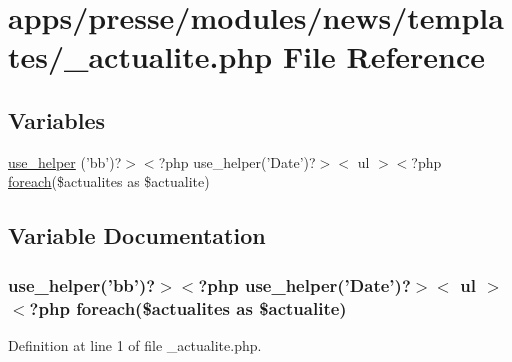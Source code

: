\hypertarget{presse_2modules_2news_2templates_2__actualite_8php}{\section{apps/presse/modules/news/templates/\-\_\-actualite.php File Reference}
\label{presse_2modules_2news_2templates_2__actualite_8php}
}
\subsection*{Variables}
\begin{DoxyCompactItemize}
\item 
\hyperlink{presse_2modules_2news_2templates_2__actualite_8php_a4be81c8b3638bb410a49744c6527babd}{use\-\_\-helper} ('bb')?$>$$<$?php use\-\_\-helper('Date')?$>$$<$ ul $>$$<$?php \hyperlink{presse_2modules_2news_2templates_2index_success_8php_abc56db52b2e9a59bcd5c9e45ac5cb332}{foreach}(\$actualites as \$actualite)
\end{DoxyCompactItemize}


\subsection{Variable Documentation}
\hypertarget{presse_2modules_2news_2templates_2__actualite_8php_a4be81c8b3638bb410a49744c6527babd}{
\subsubsection[{use\-\_\-helper}]{\setlength{\rightskip}{0pt plus 5cm}use\-\_\-helper('bb')?$>$$<$?php use\-\_\-helper('Date')?$>$$<$ ul $>$$<$?php {\bf foreach}(\$actualites as \$actualite)}}\label{presse_2modules_2news_2templates_2__actualite_8php_a4be81c8b3638bb410a49744c6527babd}


Definition at line 1 of file \-\_\-actualite.\-php.

